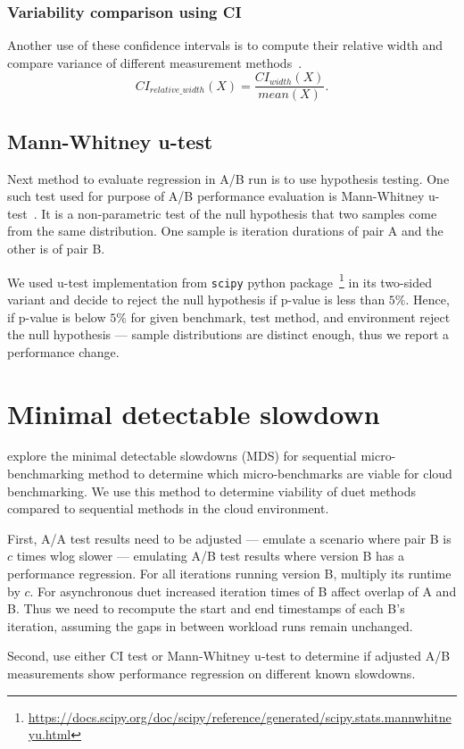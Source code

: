 \subsubsection{Variability comparison using CI}
\label{sec:ci_width}

Another use of these confidence intervals is to compute their relative width and compare variance of different measurement methods~\cite{bulej2019initial}.
$$
CI_{relative\_width}(X) = \frac{CI_{width}(X)}{mean(X)}.
$$

\subsection{Mann-Whitney u-test}
\label{sec:utest}

Next method to evaluate regression in A/B run is to use hypothesis testing.
One such test used for purpose of A/B performance evaluation is Mann-Whitney \mbox{u-test}~\cite{bulej2017stat,laaber2019software}.
It is a non-parametric test of the null hypothesis that two samples come from the same distribution.
One sample is iteration durations of pair A and the other is of pair B.

We used \mbox{u-test} implementation from \lstinline{scipy} python package~\footnote{\url{https://docs.scipy.org/doc/scipy/reference/generated/scipy.stats.mannwhitneyu.html}} in its two-sided variant and decide to reject the null hypothesis if \mbox{p-value} is less than $5\%$.
Hence, if \mbox{p-value} is below $5\%$ for given benchmark, test method, and environment reject the null hypothesis --- sample distributions are distinct enough, thus we report a performance change.


\section{Minimal detectable slowdown}
\label{sec:mds}

 explore the minimal detectable slowdowns (MDS) for sequential micro-benchmarking method to determine which micro-benchmarks are viable for cloud benchmarking.
We use this method to determine viability of duet methods compared to sequential methods in the cloud environment.

First, A/A test results need to be adjusted --- emulate a scenario where pair B is $c$ times wlog slower --- emulating A/B test results where version B has a performance regression.
For all iterations running version B, multiply its runtime by $c$.
For asynchronous duet increased iteration times of B affect overlap of A and B.
Thus we need to recompute the start and end timestamps of each B's iteration, assuming the gaps in between workload runs remain unchanged.

Second, use either CI test or Mann-Whitney u-test to determine if adjusted A/B measurements show performance regression on different known slowdowns.

